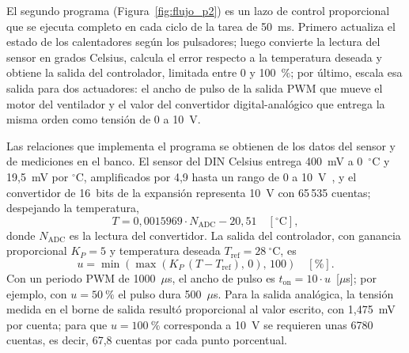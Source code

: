 \documentclass[12pt,a4paper,oneside]{report}
\begin{document}
El segundo programa (Figura~\ref{fig:flujo_p2}) es un lazo de control proporcional que se ejecuta completo en cada ciclo de la tarea de 50~ms. Primero actualiza el estado de los calentadores según los pulsadores; luego convierte la lectura del sensor en grados Celsius, calcula el error respecto a la temperatura deseada y obtiene la salida del controlador, limitada entre 0 y 100~\%; por último, escala esa salida para dos actuadores: el ancho de pulso de la salida PWM que mueve el motor del ventilador y el valor del convertidor digital-analógico que entrega la misma orden como tensión de 0 a 10~V.

Las relaciones que implementa el programa se obtienen de los datos del sensor y de mediciones en el banco. El sensor del DIN Celsius entrega 400~mV a 0~$^\circ$C y 19,5~mV por $^\circ$C, amplificados por 4,9 hasta un rango de 0 a 10~V~\cite{ref37}, y el convertidor de 16~bits de la expansión representa 10~V con 65\,535 cuentas; despejando la temperatura,
\begin{equation}
    T = 0{,}0015969 \cdot N_{\mathrm{ADC}} - 20{,}51 \quad [^\circ\mathrm{C}],
    \label{eq:temp}
\end{equation}
donde $N_{\mathrm{ADC}}$ es la lectura del convertidor. La salida del controlador, con ganancia proporcional $K_P = 5$ y temperatura deseada $T_{\mathrm{ref}} = 28~^\circ$C, es
\begin{equation}
    u = \min\!\left(\max\!\left(K_P\,(T - T_{\mathrm{ref}}),\,0\right),\,100\right) \quad [\%].
    \label{eq:control}
\end{equation}
Con un periodo PWM de 1000~$\mu$s, el ancho de pulso es $t_{\mathrm{on}} = 10 \cdot u$~[$\mu$s]; por ejemplo, con $u = 50~\%$ el pulso dura 500~$\mu$s. Para la salida analógica, la tensión medida en el borne de salida resultó proporcional al valor escrito, con 1,475~mV por cuenta; para que $u = 100~\%$ corresponda a 10~V se requieren unas 6780 cuentas, es decir, 67,8 cuentas por cada punto porcentual.
\end{document}
